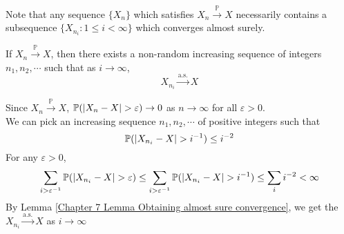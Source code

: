 \documentclass{huhtakm-template-book}
\newcommand{\prob}{\mathbb{P}}
\begin{document}
    Note that any sequence $\{X_{n}\}$ which satisfies $X_{n}\xrightarrow{\prob}X$ necessarily contains a subsequence $\{X_{n_{i}}:1\leq i<\infty\}$ which converges almost surely.
    \begin{thm}
        If $X_{n}\xrightarrow{\prob}X$, then there exists a non-random increasing sequence of integers $n_{1},n_{2},\cdots$ such that as $i\to\infty$,
        \begin{equation*}
            X_{n_{i}}\xrightarrow{\text{a.s.}}X
        \end{equation*}
    \end{thm}
    \begin{proofing}
        Since $X_{n}\xrightarrow{\prob}X$, $\prob(\abs{X_{n}-X}>\varepsilon)\to 0$ as $n\to\infty$ for all $\varepsilon>0$.\\
        We can pick an increasing sequence $n_{1},n_{2},\cdots$ of positive integers such that
        \begin{equation*}
            \prob(\abs{X_{n_{i}}-X}>i^{-1})\leq i^{-2}
        \end{equation*}
        For any $\varepsilon>0$,
        \begin{equation*}
            \sum_{i>\varepsilon^{-1}}\prob(\abs{X_{n_{i}}-X}>\varepsilon)\leq\sum_{i>\varepsilon^{-1}}\prob(\abs{X_{n_{i}}-X}>i^{-1})\leq\sum_{i}i^{-2}<\infty
        \end{equation*}
        By Lemma \ref{Chapter 7 Lemma Obtaining almost sure convergence}, we get the $X_{n_{i}}\xrightarrow{\text{a.s.}}X$ as $i\to\infty$
    \end{proofing}
    \newpage
\end{document}
